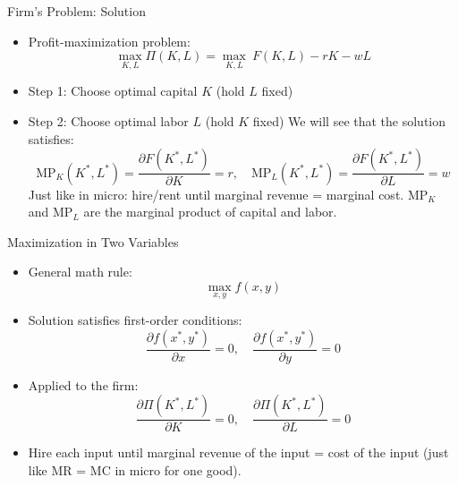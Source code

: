 \documentclass[10pt,aspectratio=169]{beamer}
\begin{document}
\begin{frame}{Firm's Problem: Solution}

\begin{itemize}
    \item Profit-maximization problem:
    \[
        \max_{K,L} \Pi(K,L)=\max_{K,L}  \ F(K,L) - r K - w L
    \]
    \vspace{-0.2cm}
    \item[-] Step 1: Choose optimal capital \(K\)  (hold \(L\) fixed)
    \item[-] Step 2: Choose optimal labor \(L\)  (hold \(K\) fixed)
    \itemvso We will see that the solution satisfies:
    \[
        \text{MP}_K(K^*,L^*)=\dfrac{\partial F(K^*,L^*)}{\partial K} = r, \quad \text{MP}_L(K^*,L^*)=\dfrac{\partial F(K^*,L^*)}{\partial L}  = w
    \]
    Just like in micro: hire/rent until marginal revenue = marginal cost.
    \itemvso $\text{MP}_K$ and $\text{MP}_L$ are the marginal product of capital and labor.
\end{itemize}

\end{frame}

\begin{frame}{Maximization in Two Variables}

\begin{itemize}
    \item General math rule:
    \[
        \max_{x,y} f(x,y)
    \]
    \vspace{-0.2cm}
    \item Solution satisfies first-order conditions:
    \[
        \frac{\partial f(x^*,y^*)}{\partial x} = 0, \quad \frac{\partial f(x^*,y^*)}{\partial y} = 0
    \]
    \vspace{-0.2cm}
    \item Applied to the firm:
    \[
        \frac{\partial \Pi(K^*,L^*)}{\partial K} = 0, \quad \frac{\partial \Pi(K^*,L^*)}{\partial L} = 0
    \]
    \item Hire each input until marginal revenue of the input = cost of the input (just like MR = MC in micro for one good).
\end{itemize}

\end{frame}
\end{document}
